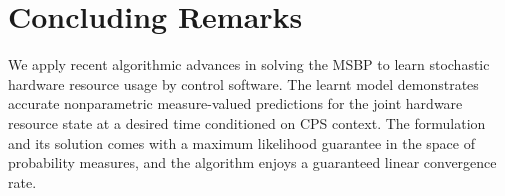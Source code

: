 \documentclass[letterpaper, 10pt, twocolumn]{ieeeconf}      %
\begin{document}

\vspace*{-0.05in}
\section{Concluding Remarks}\label{sec:conclusions}
\noindent We apply recent algorithmic advances in solving the MSBP to learn stochastic hardware resource usage by control software. The learnt model demonstrates accurate nonparametric measure-valued predictions for the joint hardware resource state at a desired time conditioned on CPS context. The formulation and its solution comes with a maximum likelihood guarantee in the space of probability measures, and the algorithm enjoys a guaranteed linear convergence rate. 





\end{document}
